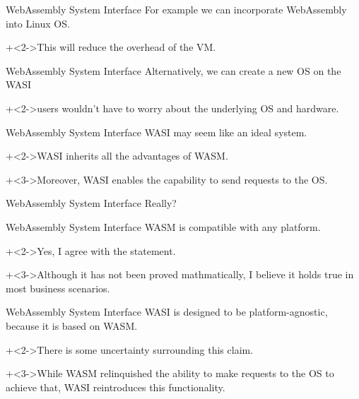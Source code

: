 \begin{frame}{WebAssembly System Interface}{}
    For example we can incorporate WebAssembly into Linux OS.
    \vspace{4ex}

    \onslide+<2->{This will reduce the overhead of the VM.}
\end{frame}


\begin{frame}{WebAssembly System Interface}{}
    Alternatively, we can create a new OS on the WASI
    \vspace{4ex}

    \onslide+<2->{users wouldn't have to worry about the underlying OS and hardware.}
\end{frame}


\begin{frame}{WebAssembly System Interface}{}
    WASI may seem like an ideal system.
    \vspace{4ex}

    \onslide+<2->{WASI inherits all the advantages of WASM.}
    \vspace{2ex}

    \onslide+<3->{Moreover, WASI enables the capability to send requests to the OS.}
\end{frame}


\begin{frame}{WebAssembly System Interface}{}
    {\Huge Really?}
\end{frame}


\begin{frame}{WebAssembly System Interface}{}
    WASM is compatible with any platform.
    \vspace{4ex}

    \onslide+<2->{Yes, I agree with the statement.}
    \vspace{4ex}

    \onslide+<3->{Although it has not been proved mathmatically, I believe it holds true in most business scenarios.}
\end{frame}


\begin{frame}{WebAssembly System Interface}{}
    WASI is designed to be platform-agnostic, because it is based on WASM.
    \vspace{4ex}

    \onslide+<2->{There is some uncertainty surrounding this claim.}
    \vspace{4ex}

    \onslide+<3->{While WASM relinquished the ability to make requests to the OS to achieve that, WASI reintroduces this functionality.}
\end{frame}


